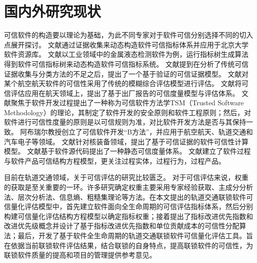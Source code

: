 \section{国内外研究现状}
可信软件的构造要以理论为基础，为此不同专家对于软件可信分别选择不同的切入点展开探讨。
文献\cite{蔡斯博2010一种支持软件资源可信评估的框架}通过证据收集来动态构造软件可信指标体系并应用于北京大学软件资源库。
文献\cite{杨善林2009一种基于效用和证据理论的可信软件评估方法}以工业领域中的金属液态检测软件为例，运行指标树生成算法得到软件可信指标树来动态构造软件可信指标系统。
文献\cite{赵倩2011基于}提到\cite{丁学雷2010面向验证的软件可信证据与可信评估}在分析了传统可信证据收集与分类方法的不足之后，提出了一个基于验证的可信证据模型。
文献\cite{Zhang2012An}对某个航空航天软件的可信性采用了传统的模糊综合评估模型进行评估。
文献\cite{王婧2015航天嵌入式软件可信性度量方法及应用研究}将可信评估应用在航天领域上，提出了基于出厂报告的可信度量模型与评估体系。
文献\cite{AmorosoE1991TowardanApproach,AmorosoE1994Aprocess-orientedmethodology}聚焦于软件开发过程提出了一种称为可信软件方法学TSM（Trusted Software Methodology）的理论，其制定了软件开发的安全原则和软件工程原则；然后，对软件进行可信性度量的原则是以可信规则为准，对比软件开发方法是否与其保持一致。
\cite{Abrial2013Modeling}阿布瑞尔教授创立了可信软件开发“B方法”，并应用于航空航天、轨道交通和汽车电子等领域。
文献\cite{伍志强2019基于可信证据的软件可信性计算模型设计与工具实现}针对核装备领域，提出了基于可信证据的软件可信性计算模型。
文献\cite{李岩2017软件可信性静态度量模型设计与工具实现}基于软件源代码提出了一种静态可信度量体系。
文献\cite{于本海2014可信软件测度理论与方法}建立了软件过程与软件产品可信结构方程模型，更关注过程实体，过程行为，过程产品。

目前在轨道交通领域，关于可信评估的研究比较匮乏。
对于可信评估来说，权重的获取是至关重要的一环。许多研究确定权重主要采用专家经验获取、主成分分析法、层次分析法、信息熵、粗糙集理论等方法\cite{张俊2016一种基于软件属性相互影响和重要性的属性权重配方法}。在本文提出的轨道交通联锁软件可信量化评估模型中，首先建立软件面向全生命周期的可信评估指标体系，然后分别构建可信量化评估结构方程模型以确定指标权重；接着提出了指标改进优先指数和改进优先级概念并设计了基于指标改进优先指数和单位贡献成本的可信性分配算法；最后，开发了基于软件全生命周期的轨道交通联锁软件可信量化评估工具。旨在依据当前联锁软件评估结果，结合联锁的自身特点，提高联锁软件的可信性，为联锁软件质量的提高和项目的管理提供参考意见。

